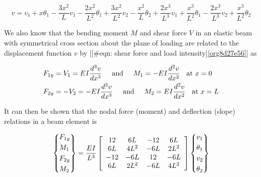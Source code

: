 \documentclass[a4paper,openany,12pt]{book}
\begin{document}
{{$$v = v_1 + x\theta_1 - \frac{3x^2}{L}v_1 - \frac{2x^2}{L^2}\theta_1 + \frac{3x^2}{L^2}v_2 - \frac{x^2}{L}\theta_2 + \frac{2x^3}{L^3}v_1 + \frac{x^3}{L^2}\theta_1 - \frac{2x^3}{L^3}v_2 + \frac{x^3}{L^2}\theta_2$$

We also know that the bending moment \(M\) and shear force \(V\) in an
elastic beam with symmetrical cross section about the plane of loading
are related to the displacement function \(v\) by
[[\#eqn: shear force and load intensity]\ref{org8d27e56}]
as

$$\begin{gathered}
  F_{1y} = V_1 = EI\frac{d^3v}{dx^3} \hspace{0.5cm} \text{and} \hspace{0.5cm}
  M_1 =  -EI\frac{d^2v}{dx^2} \hspace{0.2cm} \text{ at }x = 0 \hfill \\
  F_{2y} =  -V_2 =  - EI\frac{d^3v}{dx^3} \hspace{0.5cm} \text{and}
  \hspace{0.5cm} M_2 = EI\frac{d^2v}{dx^2} \hspace{0.2cm} \text{ at }x = L \hfill \\ \end{gathered}$$

It can then be shown that the nodal force (moment) and deflection
(slope) relations in a beam element is

\begin{gather*}
  \left\{ \begin{gathered}
      F_{1y} \hfill \\
      M_1 \hfill \\
      F_{2y} \hfill \\
      M_2 \hfill \\ 
    \end{gathered}
  \right\} = \frac{EI}{L^3}
  \left[
    \begin{array}{*{20}{c}}
      12&6L&-12&6L \\ 
      6L&4L^2&-6L&2L^2 \\ 
      -12&-6L&12&-6L \\ 
      6L&2L^2&-6L&4L^2 
    \end{array}
  \right]
  \left\{
    \begin{gathered}
      v_1 \hfill \\
      \theta _1 \hfill \\
      v_2 \hfill \\
      \theta _2 \hfill \\ 
    \end{gathered}
  \right\}
\end{gather*}

}}
\end{document}
